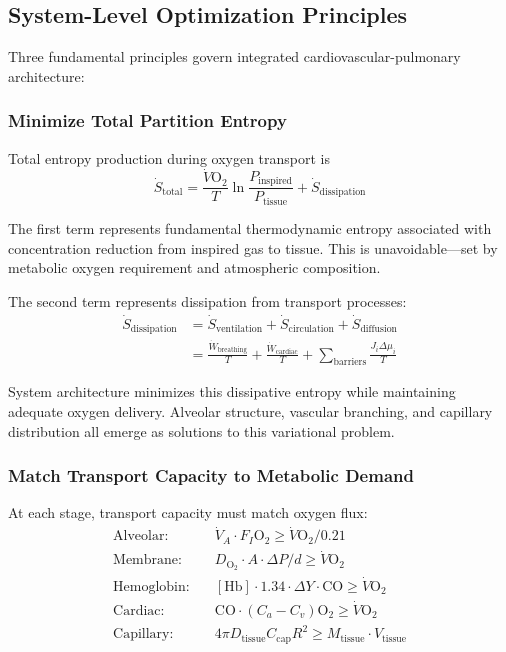 \documentclass[10pt,twocolumn,a4paper]{article}
\theoremstyle{remark}
\begin{document}
\subsection{System-Level Optimization Principles}

Three fundamental principles govern integrated cardiovascular-pulmonary architecture:

\subsubsection{Minimize Total Partition Entropy}

Total entropy production during oxygen transport is
\begin{equation}
\dot{S}_{\mathrm{total}} = \frac{\dot{V}\mathrm{O}_{2}}{T}\ln\frac{P_{\mathrm{inspired}}}{P_{\mathrm{tissue}}} + \dot{S}_{\mathrm{dissipation}}
\end{equation}

The first term represents fundamental thermodynamic entropy associated with concentration reduction from inspired gas to tissue. This is unavoidable—set by metabolic oxygen requirement and atmospheric composition.

The second term represents dissipation from transport processes:
\begin{align}
\dot{S}_{\mathrm{dissipation}} &= \dot{S}_{\mathrm{ventilation}} + \dot{S}_{\mathrm{circulation}} + \dot{S}_{\mathrm{diffusion}} \\
&= \frac{\dot{W}_{\mathrm{breathing}}}{T} + \frac{\dot{W}_{\mathrm{cardiac}}}{T} + \sum_{\mathrm{barriers}} \frac{J_{i}\Delta\mu_{i}}{T}
\end{align}

System architecture minimizes this dissipative entropy while maintaining adequate oxygen delivery. Alveolar structure, vascular branching, and capillary distribution all emerge as solutions to this variational problem.

\subsubsection{Match Transport Capacity to Metabolic Demand}

At each stage, transport capacity must match oxygen flux:
\begin{align}
\text{Alveolar:} \quad &\dot{V}_{A} \cdot F_{I}\mathrm{O}_{2} \geq \dot{V}\mathrm{O}_{2}/0.21 \\
\text{Membrane:} \quad &D_{\mathrm{O}_{2}} \cdot A \cdot \Delta P/d \geq \dot{V}\mathrm{O}_{2} \\
\text{Hemoglobin:} \quad &[\mathrm{Hb}] \cdot 1.34 \cdot \Delta Y \cdot \mathrm{CO} \geq \dot{V}\mathrm{O}_{2} \\
\text{Cardiac:} \quad &\mathrm{CO} \cdot (C_{a} - C_{v})\mathrm{O}_{2} \geq \dot{V}\mathrm{O}_{2} \\
\text{Capillary:} \quad &4\pi D_{\mathrm{tissue}} C_{\mathrm{cap}} R^{2} \geq M_{\mathrm{tissue}} \cdot V_{\mathrm{tissue}}
\end{align}
\end{document}
